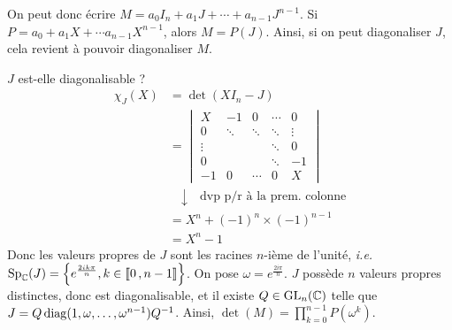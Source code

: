     On peut donc écrire $M = a_0 I_n + a_1 J + \cdots + a_{n-1} J^{n-1}$. Si $P = a_0 + a_1 X + \cdots a_{n-1} X^{n-1}$, alors $M = P(J)$. Ainsi, si on peut diagonaliser $J$, cela revient à pouvoir diagonaliser $M$.

    $J$ est-elle diagonalisable ?
    \begin{align*}
        \chi_J(X) 
        &= \det(X I_n - J) \\
        &= \begin{vmatrix}
            X & - 1 & 0 & \cdots & 0 \\
            0 & \ddots & \ddots & \ddots & \vdots \\
            \vdots & & & \ddots & 0 \\
            0 & & & \ddots & -1 \\
            -1 & 0 & \cdots & 0 & X
        \end{vmatrix} \\
        &\quad \downarrow \quad \text{dvp p/r à la prem. colonne} \\
        &= X^n + (-1)^n \times (-1)^{n-1} \\
        &= X^n - 1
    \end{align*}
    Donc les valeurs propres de $J$ sont les racines $n$-ième de l’unité, \textit{i.e.} $\operatorname{Sp}_{\mathbb{C}}(J) = \left\{e^{\frac{2ik\pi}{n}}, k \in \left\llbracket 0 \, , n-1 \right\rrbracket\right\}$. On pose $\omega = e^{\frac{2i\pi}{n}}$. $J$ possède $n$ valeurs propres distinctes, donc est diagonalisable, et il existe $Q \in \operatorname{GL}_n(\mathbb{C})$ telle que $J = Q \operatorname{diag}(1,\omega, \ldots, \omega^{n-1}) Q^{-1}$. Ainsi, $\det(M) = \prod_{k=0}^{n-1} P(\omega^k)$.

